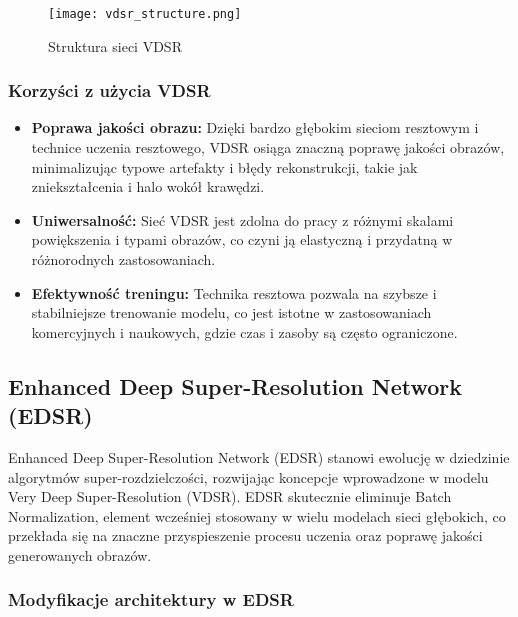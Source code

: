 \documentclass[10pt]{article}
\begin{document}
\begin{figure}[h!]
    \centering
    \texttt{[image: vdsr\_structure.png]}
    \caption{Struktura sieci VDSR}
    \label{fig:vdsr_structure}
\end{figure}

\subsubsection*{Korzyści z użycia VDSR}

\begin{itemize}
    \item \textbf{Poprawa jakości obrazu:} Dzięki bardzo głębokim sieciom resztowym i technice uczenia resztowego, VDSR osiąga znaczną poprawę jakości obrazów, minimalizując typowe artefakty i błędy rekonstrukcji, takie jak zniekształcenia i halo wokół krawędzi.
    \item \textbf{Uniwersalność:} Sieć VDSR jest zdolna do pracy z różnymi skalami powiększenia i typami obrazów, co czyni ją elastyczną i przydatną w różnorodnych zastosowaniach.
    \item \textbf{Efektywność treningu:} Technika resztowa pozwala na szybsze i stabilniejsze trenowanie modelu, co jest istotne w zastosowaniach komercyjnych i naukowych, gdzie czas i zasoby są często ograniczone.
\end{itemize}


\subsection*{Enhanced Deep Super-Resolution Network (EDSR)}

Enhanced Deep Super-Resolution Network (EDSR) stanowi ewolucję w dziedzinie algorytmów super-rozdzielczości, rozwijając koncepcje wprowadzone w modelu Very Deep Super-Resolution (VDSR). EDSR skutecznie eliminuje Batch Normalization, element wcześniej stosowany w wielu modelach sieci głębokich, co przekłada się na znaczne przyspieszenie procesu uczenia oraz poprawę jakości generowanych obrazów.

\subsubsection*{Modyfikacje architektury w EDSR}
\end{document}
